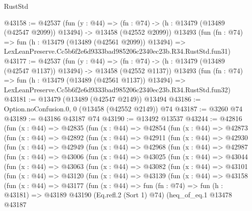 \begin{lexlean}{RustStd}
\begin{coremodule}
@43158 := @42537
    (fun (y : @44) =>
    (fn : @74) -> (h : @13479 (@13489 (@42547 @2099)) @13494) -> @13458 (@42552 @2099))
    @13493
    (fun (fn : @74) =>
    fun (h : @13479 (@13489 (@42561 @2099)) @13494) =>
    LexLeanPreserve.Cc5b6f2e6d9333bad985206c2340ec23b.R34.RustStd.fun31)
@43177 := @42537
    (fun (y : @44) =>
    (fn : @74) -> (h : @13479 (@13489 (@42547 @1137)) @13494) -> @13458 (@42552 @1137))
    @13493
    (fun (fn : @74) =>
    fun (h : @13479 (@13489 (@42561 @1137)) @13494) =>
    LexLeanPreserve.Cc5b6f2e6d9333bad985206c2340ec23b.R34.RustStd.fun32)
@43181 := @13479 (@13489 (@42547 @2149)) @13494
@43186 := Option.noConfusion.{0, 0} (@13458 (@42552 @2149)) @74
@43187 := @3260 @74
@43189 := @43186 @43187 @74
@43190 := @13492 @13537
@43244 := @42816
    (fun (x : @44) =>
    @42835
      (fun (x : @44) =>
      @42854
        (fun (x : @44) =>
        @42873
          (fun (x : @44) =>
          @42892
            (fun (x : @44) =>
            @42911
              (fun (x : @44) =>
              @42930
                (fun (x : @44) =>
                @42949
                  (fun (x : @44) =>
                  @42968
                    (fun (x : @44) =>
                    @42987
                      (fun (x : @44) =>
                      @43006
                        (fun (x : @44) =>
                        @43025
                          (fun (x : @44) =>
                          @43044
                            (fun (x : @44) =>
                            @43063
                              (fun (x : @44) =>
                              @43082
                                (fun (x : @44) =>
                                @43101
                                  (fun (x : @44) =>
                                  @43120
                                    (fun (x : @44) =>
                                    @43139
                                      (fun (x : @44) =>
                                      @43158
                                        (fun (x : @44) =>
                                        @43177
                                          (fun (x : @44) =>
                                          fun (fn : @74) =>
                                          fun (h : @43181) =>
                                          @43189
                                            @43190
                                            (Eq.refl.{2} (Sort 1) @74)
                                            (heq_of_eq.{1}
                                              @13478
                                              @43187

\end{coremodule}
\end{lexlean}
